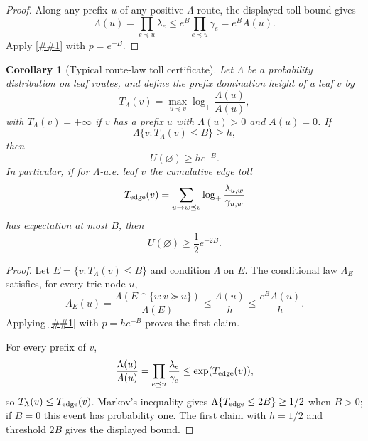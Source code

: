 \documentclass[10pt]{article}
\newcommand{\cref}[1]{\ref{##1}}
\newtheorem{corollary}[theorem]{Corollary}
\theoremstyle{definition}
\begin{document}
\begin{proof}
   Along any prefix $u$ of any positive-$\Lambda$ route, the displayed toll
   bound gives
   \[
      \Lambda(u)
      =
      \prod_{e\preceq u}\lambda_e
      \le
      e^B\prod_{e\preceq u}\gamma_e
      =
      e^BA(u).
   \]
   Apply \cref{lem:dominated-route-law} with $p=e^{-B}$.
\end{proof}

\begin{corollary}[Typical route-law toll certificate]\label{cor:typical-route-law-toll}
   Let $\Lambda$ be a probability distribution on leaf routes, and define the
   prefix domination height of a leaf $v$ by
   \[
      T_\Lambda(v)
      =
      \max_{u\preceq v}
      \log_+\frac{\Lambda(u)}{A(u)},
   \]
   with $T_\Lambda(v)=+\infty$ if $v$ has a prefix $u$ with
   $\Lambda(u)>0$ and $A(u)=0$. If
   \[
      \Lambda\{v:T_\Lambda(v)\le B\}\ge h,
   \]
   then
   \[
      U(\varnothing)\ge h e^{-B}.
   \]
   In particular, if for $\Lambda$-a.e. leaf $v$ the cumulative edge toll
   \[
      T_{\rm edge}(v)=
      \sum_{u\to w\preceq v}
      \log_+\frac{\lambda_{u,w}}{\gamma_{u,w}}
   \]
   has expectation at most $B$, then
   \[
      U(\varnothing)\ge \frac12 e^{-2B}.
   \]
\end{corollary}

\begin{proof}
   Let $E=\{v:T_\Lambda(v)\le B\}$ and condition $\Lambda$ on $E$. The
   conditional law $\Lambda_E$ satisfies, for every trie node $u$,
   \[
      \Lambda_E(u)
      =
      \frac{\Lambda(E\cap\{v:v\succeq u\})}{\Lambda(E)}
      \le
      \frac{\Lambda(u)}{h}
      \le
      \frac{e^BA(u)}{h}.
   \]
   Applying \cref{lem:dominated-route-law} with
   $p=he^{-B}$ proves the first claim.

   For every prefix of $v$,
   \[
      \frac{\Lambda(u)}{A(u)}
      =
      \prod_{e\preceq u}\frac{\lambda_e}{\gamma_e}
      \le
      \exp(T_{\rm edge}(v)),
   \]
   so $T_\Lambda(v)\le T_{\rm edge}(v)$. Markov's inequality gives
   $\Lambda\{T_{\rm edge}\le2B\}\ge1/2$ when $B>0$; if $B=0$ this event has
   probability one. The first claim with $h=1/2$ and threshold $2B$ gives the
   displayed bound.
\end{proof}
\end{document}
